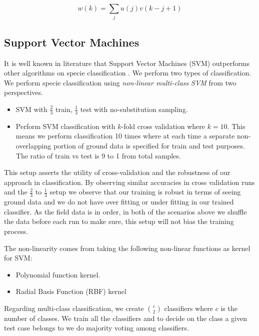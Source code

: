 \documentclass[remotesensing,article,accept,moreauthors,pdftex,12pt,a4paper]{mdpi}
\begin{document}
\begin{equation}
w(k)=\sum_j u(j)v(k-j+1)
\end{equation} 


\subsection{Support Vector Machines}

It is well known in literature that Support Vector Machines (SVM) outperforms other algorithms on specie classification \cite{colgan2012mapping, baldeck2014landscape, cho2012mapping}. We perform two types of classification. We perform specie classification using \textit{non-linear multi-class SVM} from two perspectives. 


\begin{itemize}
\item SVM with $\frac{2}{3}$ train, $\frac{1}{3}$ test with no-substitution sampling.
\item Perform SVM classification with $k$-fold cross validation where $k=10$. This means we perform classification 10 times where at each time a separate non-overlapping portion of ground data is specified for train and test purposes. The ratio of train vs test is 9 to 1 from total samples.
\end{itemize}


This setup asserts the utility of cross-validation and the robustness of our approach in classification. By observing similar accuracies in cross validation runs and the $\frac{2}{3}$ to $\frac{1}{3}$ setup we observe that our training is robust in terms of seeing ground data and we do not have  over fitting or under fitting in our trained classifier. As the field data is in order, in both of the scenarios above we shuffle the data before each run to make sure, this setup will not bias the training process.

The non-linearity comes from taking the following non-linear functions as kernel for SVM: 

\begin{itemize}
\item Polynomial function kernel.
\item Radial Basis Function (RBF) kernel
\end{itemize}

Regarding multi-class classification, we create $\binom{c}{2}$ classifiers where $c$ is the number of classes. We train all the classifiers and to decide on the class a given test case belongs to we do majority voting among classifiers. 
\end{document}
